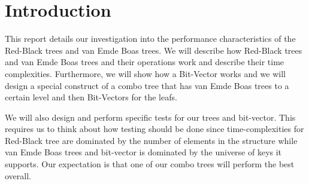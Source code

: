 \documentclass[oneside,11pt,openright]{report}
\begin{document}

\pagestyle{empty} 
\vspace*{\fill}
\clearpage


\tableofcontents
{}
\setcounter{secnumdepth}{2}


\chapter{Introduction}

This report details our investigation into the performance
characteristics of the Red-Black trees and van Emde Boas trees. We will describe how Red-Black trees  and van Emde Boas trees and their operations work and describe their time complexities. Furthermore, we will show how a Bit-Vector works and we will design a special construct of a combo tree that has van Emde Boas trees to a certain level and then Bit-Vectors for the leafs.

We will also design and perform specific tests for our trees and bit-vector. This requires us to think about how testing should be done since time-complexities for Red-Black tree are dominated by the number of elements in the structure while van Emde Boas trees and bit-vector is dominated by the universe of keys it supports. Our expectation is that one of our combo trees will perform the best overall. 
\end{document}
